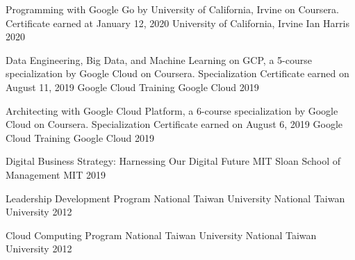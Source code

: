 

\begin{cvhonors}

  \cvhonor
    {Programming with Google Go by University of California, Irvine on Coursera. Certificate earned at January 12, 2020} %
    {University of California, Irvine} %
    {Ian Harris} %
    {2020} %

  \cvhonor
    {Data Engineering, Big Data, and Machine Learning on GCP, a 5-course specialization by Google Cloud on Coursera. Specialization Certificate earned on August 11, 2019} %
    {Google Cloud Training} %
    {Google Cloud} %
    {2019} %

  \cvhonor
    {Architecting with Google Cloud Platform, a 6-course specialization by Google Cloud on Coursera. Specialization Certificate earned on August 6, 2019} %
    {Google Cloud Training} %
    {Google Cloud} %
    {2019} %

  \cvhonor
    {Digital Business Strategy: Harnessing Our Digital Future} %
    {MIT Sloan School of Management} %
    {MIT} %
    {2019} %

  \cvhonor
    {Leadership Development Program} %
    {National Taiwan University} %
    {National Taiwan University} %
    {2012} %

  \cvhonor
    {Cloud Computing Program} %
    {National Taiwan University} %
    {National Taiwan University} %
    {2012} %

\end{cvhonors}
